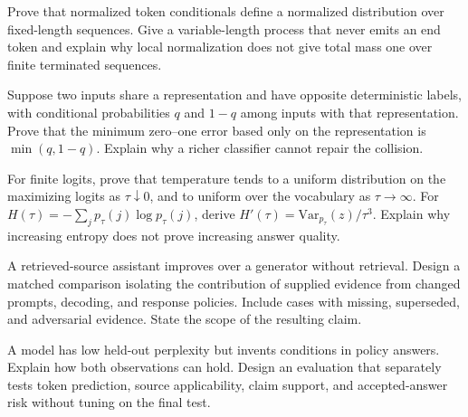 \clearpage
\begin{challengeexercises}
\item {}Prove that normalized token conditionals define a normalized distribution over fixed-length sequences. Give a variable-length process that never emits an end token and explain why local normalization does not give total mass one over finite terminated sequences.
\begin{samepage}
\item {}Suppose two inputs share a representation and have opposite deterministic labels, with conditional probabilities $q$ and $1-q$ among inputs with that representation. Prove that the minimum zero--one error based only on the representation is $\min(q,1-q)$. Explain why a richer classifier cannot repair the collision.\par
\end{samepage}
\item {}For finite logits, prove that temperature tends to a uniform distribution on the maximizing logits as $\tau\downarrow0$, and to uniform over the vocabulary as $\tau\to\infty$. For $H(\tau)=-\sum_jp_\tau(j)\log p_\tau(j)$, derive $H'(\tau)=\mathrm{Var}_{p_\tau}(z)/\tau^3$. Explain why increasing entropy does not prove increasing answer quality.
\item {}A retrieved-source assistant improves over a generator without retrieval. Design a matched comparison isolating the contribution of supplied evidence from changed prompts, decoding, and response policies. Include cases with missing, superseded, and adversarial evidence. State the scope of the resulting claim.
\item {}A model has low held-out perplexity but invents conditions in policy answers. Explain how both observations can hold. Design an evaluation that separately tests token prediction, source applicability, claim support, and accepted-answer risk without tuning on the final test.
\end{challengeexercises}

\clearpage
\begingroup\pagestyle{empty}\cleardoublepage\endgroup
\endgroup
